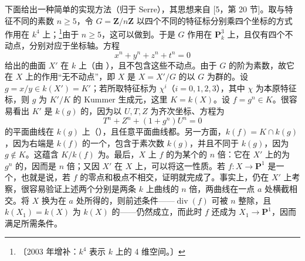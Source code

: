 下面给出一种简单的实现方法（归于 Serre），其思想来自 [5，第 20 节]。取与特征不同的素数 $n\geq5$，令 $G=\mathbf Z/n\mathbf Z$ 以四个不同的特征标分别乘四个坐标的方式作用在 $k^4$ 上；\footnote{〔2003 年增补：$k^4$ 表示 $k$ 上的 4 维空间。〕}由于 $n\geq5$，这可以做到。于是 $G$ 作用在 $\mathbf P_k^3$ 上，且仅有四个不动点，分别对应于坐标轴。方程
\[
x^n+y^n+z^n+t^n=0
\]
给出的曲面 $X'$ 在 $k$ 上（由 ），且不包含这些不动点。由于 $G$ 的阶为素数，故它在 $X$ 上的作用“无不动点”，即 $X$ 是 $X=X'/G$ 的以 $G$ 为群的。设 $g=x/y\in k(X')=K'$；若所取特征标为 $\chi^i$（$i=0,1,2,3$），其中 $\chi$ 为本原特征标，则 $g$ 为 $K'/K$ 的 Kummer 生成元，这里 $K=k(X)$。设 $f=g^n\in K$。很容易看出 $K'$ 是 $k(g)$ 的，因为以 $U,T,Z$ 为齐次坐标、方程为
\[
T^n+Z^n+(1+g^n)U^n=0
\]
的平面曲线在 $k(g)$ 上（），且任意平面曲线都。另一方面，$k(f)=K\cap k(g)$，因为右端是 $k(f)$ 的一个，包含于素次数 $k(g)$，并且不同于 $k(g)$，因为 $g\notin K$。这蕴含 $K/k(f)$ 为。最后，$X$ 上 $f$ 的为某个的 $n$ 倍：它在 $X'$ 上的为 $g^n$ 的，因而是 $n$ 倍；又因 $X'$ 在 $X$ 上，可以将这一性质。若 $f:X\to\mathbf P^1$ 是一个，也就是说，若 $f$ 的零点和极点不相交，证明就完成了。事实上，仍在 $X'$ 上考察，很容易验证上述两个分别是两条 $k$ 上曲线的 $n$ 倍，两曲线在一点 $a$ 处横截相交。将 $X$ 换为在 $a$ 处所得的，则前述条件——$\operatorname{div}(f)$ 可被 $n$ 整除，且 $k(X_1)=k(X)$ 为 $k(X)$ 的——仍然成立，而此时 $f$ 还成为 $X_1\to\mathbf P^1$，因而满足所需条件。


